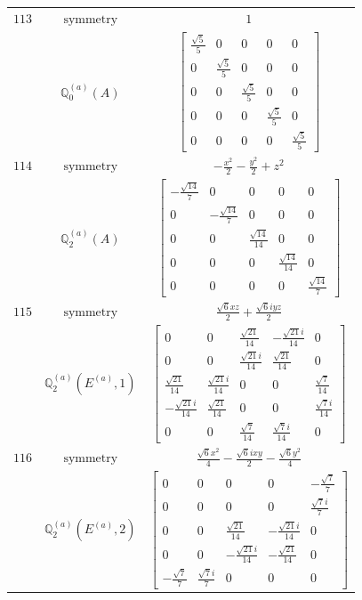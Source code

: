 \documentclass[fleqn,8pt,landscape]{jsarticle}
\begin{document}
\begin{longtable}{ccc}
$ 113 $ & $ \text{symmetry} $ & $ 1 $ \\
$  $ & $ \mathbb{Q}_{0}^{(a)}(A) $ & $ \begin{bmatrix} \frac{\sqrt{5}}{5} & 0 & 0 & 0 & 0 \\ 0 & \frac{\sqrt{5}}{5} & 0 & 0 & 0 \\ 0 & 0 & \frac{\sqrt{5}}{5} & 0 & 0 \\ 0 & 0 & 0 & \frac{\sqrt{5}}{5} & 0 \\ 0 & 0 & 0 & 0 & \frac{\sqrt{5}}{5} \end{bmatrix} $ \\ \hline
$ 114 $ & $ \text{symmetry} $ & $ - \frac{x^{2}}{2} - \frac{y^{2}}{2} + z^{2} $ \\
$  $ & $ \mathbb{Q}_{2}^{(a)}(A) $ & $ \begin{bmatrix} - \frac{\sqrt{14}}{7} & 0 & 0 & 0 & 0 \\ 0 & - \frac{\sqrt{14}}{7} & 0 & 0 & 0 \\ 0 & 0 & \frac{\sqrt{14}}{14} & 0 & 0 \\ 0 & 0 & 0 & \frac{\sqrt{14}}{14} & 0 \\ 0 & 0 & 0 & 0 & \frac{\sqrt{14}}{7} \end{bmatrix} $ \\ \hline
$ 115 $ & $ \text{symmetry} $ & $ \frac{\sqrt{6} x z}{2} + \frac{\sqrt{6} i y z}{2} $ \\
$  $ & $ \mathbb{Q}_{2}^{(a)}(E^{(a)},1) $ & $ \begin{bmatrix} 0 & 0 & \frac{\sqrt{21}}{14} & - \frac{\sqrt{21} i}{14} & 0 \\ 0 & 0 & \frac{\sqrt{21} i}{14} & \frac{\sqrt{21}}{14} & 0 \\ \frac{\sqrt{21}}{14} & \frac{\sqrt{21} i}{14} & 0 & 0 & \frac{\sqrt{7}}{14} \\ - \frac{\sqrt{21} i}{14} & \frac{\sqrt{21}}{14} & 0 & 0 & \frac{\sqrt{7} i}{14} \\ 0 & 0 & \frac{\sqrt{7}}{14} & \frac{\sqrt{7} i}{14} & 0 \end{bmatrix} $ \\ \hline
$ 116 $ & $ \text{symmetry} $ & $ \frac{\sqrt{6} x^{2}}{4} - \frac{\sqrt{6} i x y}{2} - \frac{\sqrt{6} y^{2}}{4} $ \\
$  $ & $ \mathbb{Q}_{2}^{(a)}(E^{(a)},2) $ & $ \begin{bmatrix} 0 & 0 & 0 & 0 & - \frac{\sqrt{7}}{7} \\ 0 & 0 & 0 & 0 & \frac{\sqrt{7} i}{7} \\ 0 & 0 & \frac{\sqrt{21}}{14} & - \frac{\sqrt{21} i}{14} & 0 \\ 0 & 0 & - \frac{\sqrt{21} i}{14} & - \frac{\sqrt{21}}{14} & 0 \\ - \frac{\sqrt{7}}{7} & \frac{\sqrt{7} i}{7} & 0 & 0 & 0 \end{bmatrix} $ \\ \hline

\end{longtable}
\end{document}
